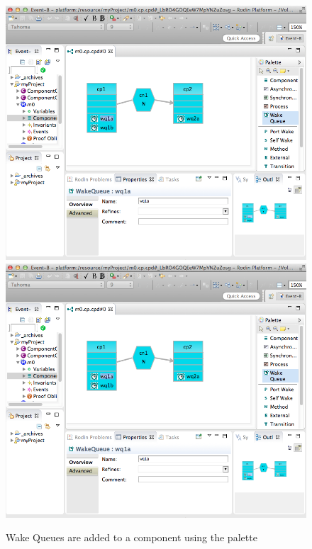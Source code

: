 \begin{figure}[!htbp]
  \centering
  \ifplastex
  \includegraphics[width=1024]{figures/image56.png}
  \else
  \includegraphics[width=1\textwidth]{figures/image56.png}
  \fi
  \caption{Wake Queues are added to a component using the palette}
  \label{fig:Wake QueuesAreAddedToAComponentUsingThePalette}
\end{figure}  

